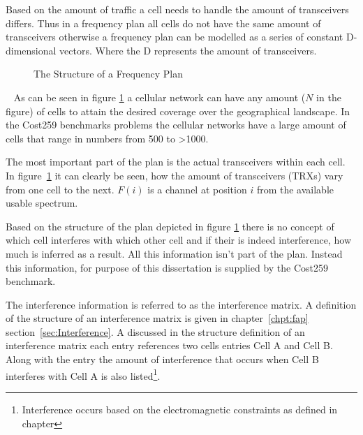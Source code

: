 Based on the amount of traffic a cell needs to handle the amount of transceivers differs. Thus in a frequency plan all cells do not have the same amount of transceivers otherwise a frequency plan can be modelled as a series of constant D-dimensional vectors. Where the D represents the amount of transceivers. 
~
\begin{figure}[ht]
	\centering
	\setlength \fboxsep{0pt}
	\setlength \fboxrule{0.5pt}
	\caption{The Structure of a Frequency Plan}
	\label{fig:fapPlan}
\end{figure}
~
As can be seen in figure \ref{fig:fapPlan} a cellular network can have any amount ($N$ in the figure) of cells to attain the desired coverage over the geographical landscape. In the Cost259 benchmarks problems the cellular networks have a large amount of cells that range in numbers from 500 to >1000. 

The most important part of the plan is the actual transceivers within each cell. In figure~\ref{fig:fapPlan} it can clearly be seen, how the amount of transceivers (TRXs) vary from one cell to the next. $F(i)$ is a channel at position $i$ from the available usable spectrum. 

Based on the structure of the plan depicted in figure \ref{fig:fapPlan} there is no concept of which cell interferes with which other cell and if their is indeed interference, how much is inferred as a result. All this information isn't part of the plan. Instead this information, for purpose of this dissertation is supplied by the Cost259 benchmark. 

The interference information is referred to as the interference matrix. A definition of the structure of an interference matrix is given in chapter~\ref{chpt:fap} section~\ref{sec:Interference}. A discussed in the structure definition of an interference matrix each entry references two cells entries Cell A and Cell B. Along with the entry the amount of interference that occurs when Cell B interferes with Cell A is also listed\footnote{Interference occurs based on the electromagnetic constraints as defined in chapter}.

